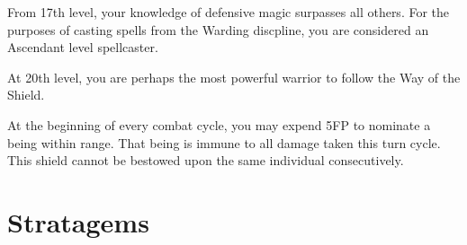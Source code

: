 {
{
	From 17th level, your knowledge of defensive magic surpasses all others. For the purposes of casting spells from the Warding discpline, you are considered an Ascendant level spellcaster. 
	
}

{
	At 20th level, you are perhaps the most powerful warrior to follow the Way of the Shield. 
	
	At the beginning of every combat cycle, you may expend 5FP to nominate a being within range. That being is immune to all damage taken this turn cycle. This shield cannot be bestowed upon the same individual consecutively. 
}

\section*{Stratagems}

\newcommand\stratagem[3]
{
{\large \textbf{\textit{#1}}}: #2

Available to members of the {#3}. \\~\\ 
}

}

